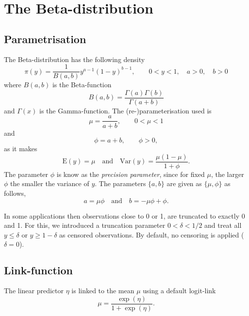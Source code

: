 \documentclass[a4paper,11pt]{article}
\begin{document}
\section*{The Beta-distribution}

\subsection*{Parametrisation}

The Beta-distribution has the following density
\begin{displaymath}
    \pi(y) = \frac{1}{B(a, b)} y^{a-1}(1-y)^{b-1}, \qquad 0 < y < 1,
    \quad a>0, \quad b > 0
\end{displaymath}
where $B(a, b)$
is the Beta-function 
\begin{displaymath}
    B(a, b) = \frac{\Gamma(a)\Gamma(b)}{\Gamma(a+b)}
\end{displaymath}
and $\Gamma(x)$ is the Gamma-function.
The (re-)parameterisation used is
\begin{displaymath}
    \mu = \frac{a}{a+b}, \qquad 0 < \mu < 1
\end{displaymath}
and
\begin{displaymath}
    \phi = a + b, \qquad \phi > 0,
\end{displaymath}
as it makes
\begin{displaymath}
    \text{E}(y) = \mu \quad\text{and}\quad \text{Var}(y) = \frac{\mu(1-\mu)}{1+\phi}.
\end{displaymath}
The parameter $\phi$ is know as the \emph{precision parameter}, since
for fixed $\mu$, the larger $\phi$ the smaller the variance of $y$.
The parameters $\{a, b\}$ are given as $\{\mu, \phi\}$ as follows,
\begin{displaymath}
    a = \mu \phi \quad\text{and}\quad  b = -\mu \phi + \phi.
\end{displaymath}

In some applications then observations close to 0 or 1, are truncated
to exactly 0 and 1. For this, we introduced a truncation parameter
$0 < \delta<1/2$ and treat all $y \le \delta$ or $y \ge 1-\delta$ as
censored observations. By default, no censoring is applied
($\delta=0$).


\subsection*{Link-function}

The linear predictor $\eta$ is linked to the mean $\mu$ using a
default logit-link
\begin{displaymath}
    \mu = \frac{\exp(\eta)}{1+\exp(\eta)}.
\end{displaymath}
\end{document}
